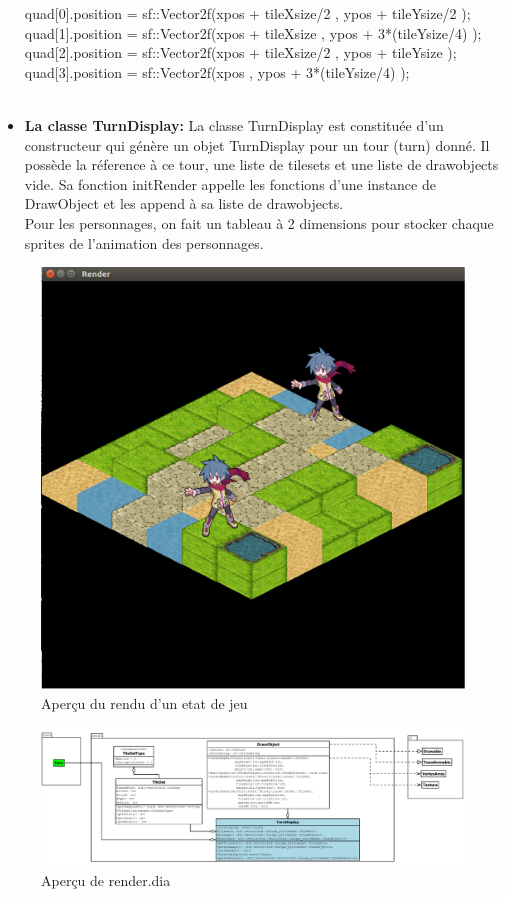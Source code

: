 \begin{itemize}
                quad[0].position = sf::Vector2f(xpos + tileXsize/2     , ypos + tileYsize/2    );
                \\quad[1].position = sf::Vector2f(xpos + tileXsize     , ypos + 3*(tileYsize/4)     );
                \\quad[2].position = sf::Vector2f(xpos + tileXsize/2   , ypos + tileYsize         );
                \\quad[3].position = sf::Vector2f(xpos                 , ypos + 3*(tileYsize/4)   );
\\
\\
    \item \textbf{La classe TurnDisplay:} La classe TurnDisplay est 
    constituée d'un constructeur qui génère un objet TurnDisplay pour un tour (turn) donné. 
    Il possède la réference à ce tour,
    une liste de tilesets et une liste de drawobjects vide.
    Sa fonction initRender appelle 
    les fonctions d'une instance de DrawObject 
    et les append à sa liste de drawobjects. 
    \\
    Pour les personnages, on fait un tableau à 2 dimensions pour
    stocker chaque sprites de l'animation des personnages.
\end{itemize}

\begin{figure}[H]
\includegraphics[width=\linewidth]{images/RenderPreview.png}
\centering
\caption{Aperçu du rendu d'un etat de jeu}
\label{fig:img3}
\end{figure}

\begin{figure}[H]
\includegraphics[width=\linewidth]{images/renderdia.png}
\centering
\caption{Aperçu de render.dia}
\label{fig:img3}
\end{figure}
